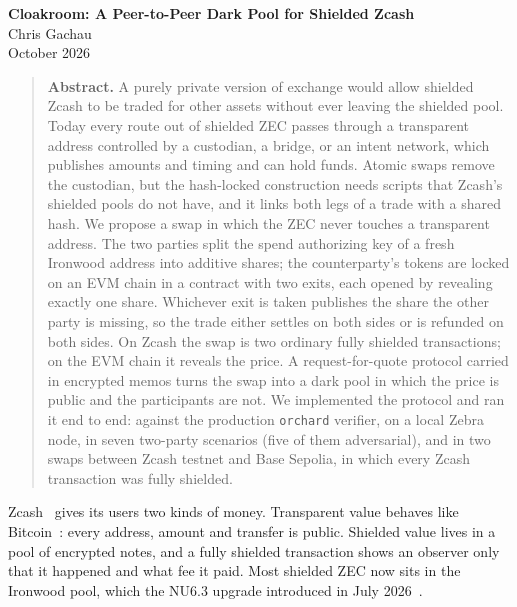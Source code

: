 \documentclass[10pt,letterpaper]{article}
\makeatletter
\renewcommand\section{\@startsection{section}{1}{\z@}{-1.3em}{0.45em}{\normalfont\large\bfseries}}
\newcommand{\fn}[1]{\texttt{#1}}
\makeatother
\begin{document}
\begin{center}
{\Large\bfseries Cloakroom: A Peer-to-Peer Dark Pool for Shielded Zcash}\\[1.1em]
{\normalsize Chris Gachau}\\[0.25em]
{\small October 2026}
\end{center}

\vspace{0.4em}
\begin{quote}
\small
\textbf{Abstract.} A purely private version of exchange would allow shielded Zcash to be traded
for other assets without ever leaving the shielded pool. Today every route out of shielded ZEC
passes through a transparent address controlled by a custodian, a bridge, or an intent network,
which publishes amounts and timing and can hold funds. Atomic swaps remove the custodian, but the
hash-locked construction needs scripts that Zcash's shielded pools do not have, and it links both
legs of a trade with a shared hash. We propose a swap in which the ZEC never touches a transparent
address. The two parties split the spend authorizing key of a fresh Ironwood address into
additive shares; the counterparty's tokens are locked on an EVM chain in a contract with two exits,
each opened by revealing exactly one share. Whichever exit is taken publishes the share the other
party is missing, so the trade either settles on both sides or is refunded on both sides. On Zcash
the swap is two ordinary fully shielded transactions; on the EVM chain it reveals the price. A
request-for-quote protocol carried in encrypted memos turns the swap into a dark pool in which the
price is public and the participants are not. We implemented the protocol and ran it end to end:
against the production \fn{orchard} verifier, on a local Zebra node, in seven two-party
scenarios (five of them adversarial), and in two swaps between Zcash testnet and Base Sepolia, in which every Zcash
transaction was fully shielded.
\end{quote}

\section{Introduction}

Zcash~\cite{zerocash,spec} gives its users two kinds of money. Transparent value behaves like
Bitcoin~\cite{bitcoin}: every address, amount and transfer is public. Shielded value lives in a pool
of encrypted notes, and a fully shielded transaction shows an observer only that it happened and
what fee it paid. Most shielded ZEC now sits in the Ironwood pool, which the NU6.3 upgrade
introduced in July 2026~\cite{zip258}.
\end{document}
